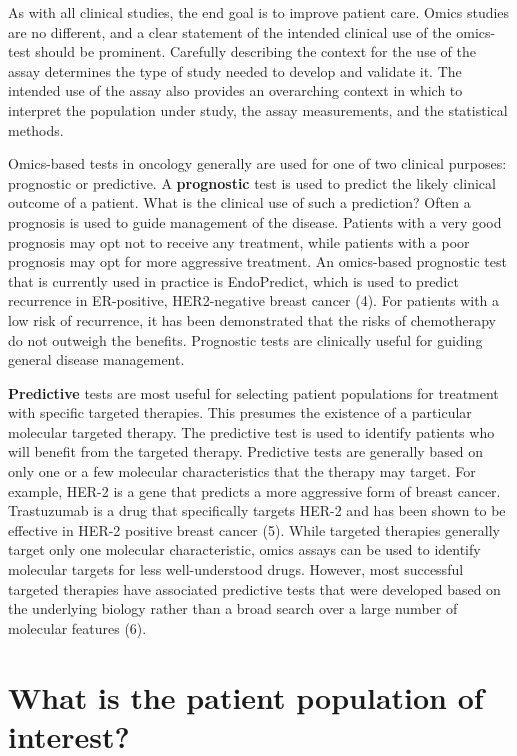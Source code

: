 \documentclass[11pt]{article}
\begin{document}
As with all clinical studies, the end goal is to improve patient care.
Omics studies are no different, and a clear statement of the intended
clinical use of the omics-test should be prominent. Carefully describing
the context for the use of the assay determines the type of study needed
to develop and validate it. The intended use of the assay also provides
an overarching context in which to interpret the population under study,
the assay measurements, and the statistical methods.

Omics-based tests in oncology generally are used for one of two clinical
purposes: prognostic or predictive. A \textbf{prognostic} test is used
to predict the likely clinical outcome of a patient. What is the
clinical use of such a prediction? Often a prognosis is used to guide
management of the disease. Patients with a very good prognosis may opt
not to receive any treatment, while patients with a poor prognosis may
opt for more aggressive treatment. An omics-based prognostic test that
is currently used in practice is EndoPredict, which is used to predict
recurrence in ER-positive, HER2-negative breast cancer (4). For patients
with a low risk of recurrence, it has been demonstrated that the risks
of chemotherapy do not outweigh the benefits. Prognostic tests are
clinically useful for guiding general disease management.

\textbf{Predictive} tests are most useful for selecting patient
populations for treatment with specific targeted therapies. This
presumes the existence of a particular molecular targeted therapy. The
predictive test is used to identify patients who will benefit from the
targeted therapy. Predictive tests are generally based on only one or a
few molecular characteristics that the therapy may target. For example,
HER-2 is a gene that predicts a more aggressive form of breast cancer.
Trastuzumab is a drug that specifically targets HER-2 and has been shown
to be effective in HER-2 positive breast cancer (5). While targeted
therapies generally target only one molecular characteristic, omics
assays can be used to identify molecular targets for less
well-understood drugs. However, most successful targeted therapies have
associated predictive tests that were developed based on the underlying
biology rather than a broad search over a large number of molecular
features (6).

\section{What is the patient population of
interest?}\label{what-is-the-patient-population-of-interest}
\end{document}
